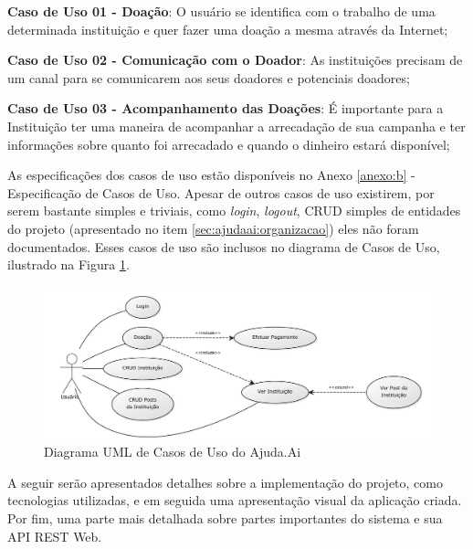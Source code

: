 \begin{lista}
  \item \textbf{Caso de Uso 01 - Doação}: O usuário se identifica com o trabalho de uma determinada instituição e quer fazer uma doação a mesma através da Internet;
  \item \textbf{Caso de Uso 02 - Comunicação com o Doador}: As instituições precisam de um canal para se comunicarem aos seus doadores e potenciais doadores;
  \item \textbf{Caso de Uso 03 - Acompanhamento das Doações}: É importante para a Instituição ter uma maneira de acompanhar a arrecadação de sua campanha e ter informações sobre quanto foi arrecadado e quando o dinheiro estará disponível;
\end{lista}

As especificações dos casos de uso estão disponíveis no Anexo \ref{anexo:b} - Especificação de Casos de Uso. Apesar de outros casos de uso existirem, por serem bastante simples e triviais, como \emph{login}, \emph{logout}, CRUD simples de entidades do projeto  (apresentado no item \ref{sec:ajudaai:organizacao}) eles não foram documentados. Esses casos de uso são inclusos no diagrama de Casos de Uso, ilustrado na Figura \ref{fig:uml_caso_uso}.

\begin{figure}[H]
  \caption{\label{fig:uml_caso_uso}Diagrama UML de Casos de Uso do Ajuda.Ai}
  \centering
  \includegraphics[scale=0.4]{imagens/uml-casos-de-uso-02.pdf}
\end{figure}

A seguir serão apresentados detalhes sobre a implementação do projeto, como tecnologias utilizadas, e em seguida uma apresentação visual da aplicação criada. Por fim, uma parte mais detalhada sobre partes importantes do sistema e sua API REST Web.





